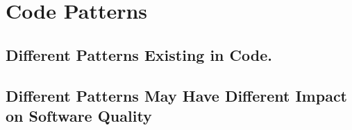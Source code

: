 \section{Code Patterns}
\subsection{Different Patterns Existing in Code.}
\subsection{Different Patterns May Have Different Impact on Software Quality}